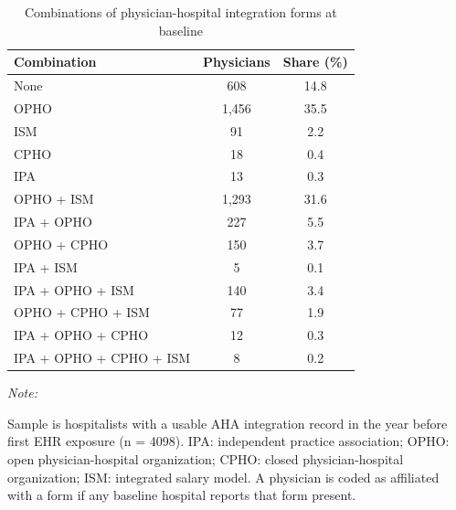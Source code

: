 \begin{table}[!h]
\centering
\caption{\label{tab:integration_combos}Combinations of physician-hospital integration forms at baseline}
\centering
\begin{threeparttable}
\begin{tabular}[t]{lcc}
\toprule
Combination & Physicians & Share (\%)\\
\midrule
None & 608 & 14.8\\
OPHO & 1,456 & 35.5\\
ISM & 91 & 2.2\\
CPHO & 18 & 0.4\\
IPA & 13 & 0.3\\
\addlinespace
OPHO + ISM & 1,293 & 31.6\\
IPA + OPHO & 227 & 5.5\\
OPHO + CPHO & 150 & 3.7\\
IPA + ISM & 5 & 0.1\\
IPA + OPHO + ISM & 140 & 3.4\\
\addlinespace
OPHO + CPHO + ISM & 77 & 1.9\\
IPA + OPHO + CPHO & 12 & 0.3\\
IPA + OPHO + CPHO + ISM & 8 & 0.2\\
\bottomrule
\end{tabular}
\begin{tablenotes}
\item \textit{Note: } 
\item Sample is hospitalists with a usable AHA integration record in the year before first EHR exposure (n = 4098). IPA: independent practice association; OPHO: open physician-hospital organization; CPHO: closed physician-hospital organization; ISM: integrated salary model. A physician is coded as affiliated with a form if any baseline hospital reports that form present.
\end{tablenotes}
\end{threeparttable}
\end{table}
